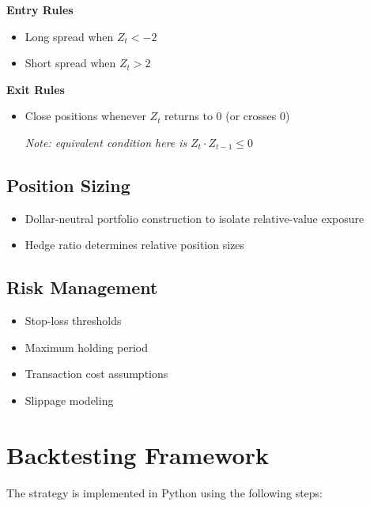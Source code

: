\documentclass[11pt]{article}
\begin{document}
\textbf{Entry Rules}

\begin{itemize}
\item Long spread when $Z_t < -2$
\item Short spread when $Z_t > 2$
\end{itemize}

\textbf{Exit Rules}

\begin{itemize}
\item Close positions whenever $Z_t$ returns to 0 (or crosses 0)

\textit{Note: equivalent condition here is} $Z_t \cdot Z_{t-1} \le 0$
\end{itemize}

\subsection{Position Sizing}

\begin{itemize}
\item Dollar-neutral portfolio construction to isolate relative-value exposure
\item Hedge ratio determines relative position sizes
\end{itemize}

\subsection{Risk Management}

\begin{itemize}
\item Stop-loss thresholds
\item Maximum holding period
\item Transaction cost assumptions
\item Slippage modeling
\end{itemize}

\section{Backtesting Framework}

The strategy is implemented in Python using the following steps:
\end{document}
